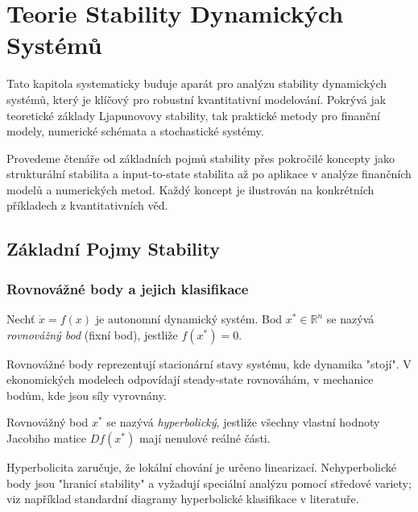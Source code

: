 \section{Teorie Stability Dynamických Systémů}
\label{sec:teorie-stability}

Tato kapitola systematicky buduje aparát pro analýzu stability dynamických systémů, který je klíčový pro robustní kvantitativní modelování. Pokrývá jak teoretické základy Ljapunovovy stability, tak praktické metody pro finanční modely, numerické schémata a stochastické systémy.

Provedeme čtenáře od základních pojmů stability přes pokročilé koncepty jako strukturální stabilita a input-to-state stabilita až po aplikace v analýze finančních modelů a numerických metod. Každý koncept je ilustrován na konkrétních příkladech z kvantitativních věd.


\spc

\subsection{Základní Pojmy Stability}

\subsubsection{Rovnovážné body a jejich klasifikace}

\begin{definition}
Nechť $\dot{x} = f(x)$ je autonomní dynamický systém. Bod $x^* \in \mathbb{R}^n$ se nazývá \emph{rovnovážný bod} (fixní bod), jestliže $f(x^*) = 0$.
\end{definition}

\begin{intuition}
Rovnovážné body reprezentují stacionární stavy systému, kde dynamika "stojí". V ekonomických modelech odpovídají steady-state rovnováhám, v mechanice bodům, kde jsou síly vyrovnány.
\end{intuition}

\begin{definition}
Rovnovážný bod $x^*$ se nazývá \emph{hyperbolický}, jestliže všechny vlastní hodnoty Jacobiho matice $Df(x^*)$ mají nenulové reálné části.
\end{definition}

\begin{intuition}
Hyperbolicita zaručuje, že lokální chování je určeno linearizací. Nehyperbolické body jsou "hranicí stability" a vyžadují speciální analýzu pomocí středové variety; viz například standardní diagramy hyperbolické klasifikace v literatuře.
\end{intuition}

